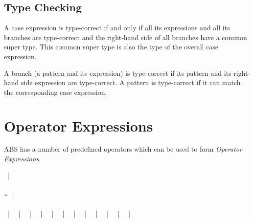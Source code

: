 \subsection{Type Checking}
A case expression is type-correct if and only if all its expressions and all its branches are type-correct and the right-hand side of all branches have a common super type. This common super type is also the type of the overall case expression. 

A branch (a pattern and its expression) is type-correct if its pattern and its right-hand side expression are type-correct.
A pattern is type-correct if it can match the corresponding case expression.

\section{Operator Expressions}
ABS has a number of predefined operators which can be used to form \emph{Operator Expressions}.

\begin{abssyntax}
  {}
              ~|~ \\
     {}\ \\
      \verb*_~_ ~|~ \TRS{-}\\
    {}\ \ \\
     \TRS{||} ~|~\TRS{\&\&} ~|~ \TRS{==} ~|~ \TRS{!=} ~|~ \TRS{<} ~|~ \TRS{<=} ~|~ \TRS{>} ~|~ \TRS{>=} ~|~ \TRS{+} ~|~ \TRS{-} ~|~ \TRS{*} ~|~ \TRS{/} ~|~ \TRS{\%}
\end{abssyntax}

